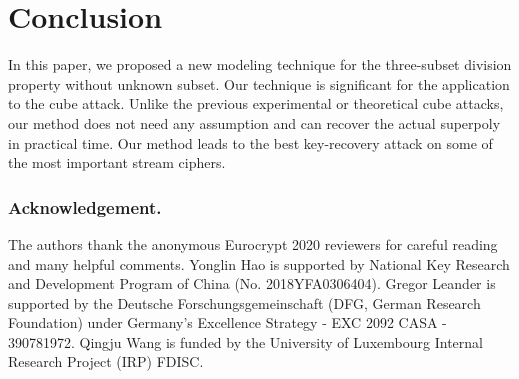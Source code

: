 \section{Conclusion}
In this paper, we proposed a new modeling technique for the three-subset division property without unknown subset.
Our technique is significant for the application to the cube attack.
Unlike the previous experimental or theoretical cube attacks, our method does not need any assumption and can recover the actual superpoly in practical time.
Our method leads to the best key-recovery attack on some of the most important stream ciphers.


\subsubsection*{Acknowledgement.}
The authors thank the anonymous Eurocrypt 2020 reviewers for careful reading and many helpful comments.
Yonglin Hao is supported by National Key Research and Development Program of China (No. 2018YFA0306404).
Gregor Leander is supported  by the Deutsche Forschungsgemeinschaft (DFG, German Research Foundation) under Germany's Excellence Strategy - EXC 2092 CASA - 390781972.
Qingju Wang is funded by the University of Luxembourg Internal Research Project (IRP) FDISC.



\ifLNCSVER
  
\else
  
\fi





\ifLNCSVER

\else

\fi





